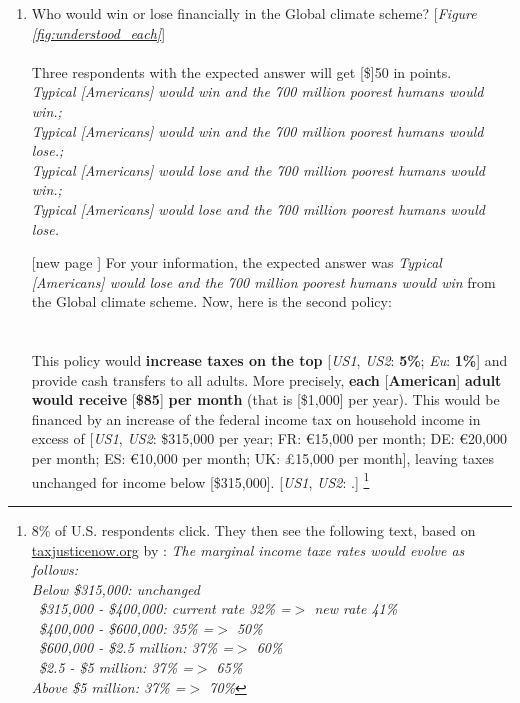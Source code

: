 \documentclass[12pt,english]{article}
\begin{document}
\begin{enumerate}[resume]
\item \label{q:understood_gcs} Who would win or lose financially in the Global climate scheme? [\textit{Figure \ref{fig:understood_each}}] \\
\\
Three respondents with the expected answer will get [\$]50 in points.
\\ \textit{Typical [Americans] would win and the 700 million poorest humans would win.; \\Typical [Americans] would win and the 700 million poorest humans would lose.; \\Typical [Americans] would lose and the 700 million poorest humans would win.; \\Typical [Americans] would lose and the 700 million poorest humans would lose.}
\item[[new page\!\!\!]] For your information, the expected answer was \textit{Typical [Americans] would lose and the 700 million poorest humans would win} from the Global climate scheme. Now, here is the second policy: \\ 
\\
\textbf{}\\ This policy would \textbf{increase taxes on the top} [\textit{US1}, \textit{US2}: \textbf{5\%}; 
\textit{Eu}: \textbf{1\%}] and provide cash transfers to all adults. More precisely, \textbf{each }[\textbf{American}]\textbf{ adult would receive }[\textbf{\$85}]\textbf{ per month} (that is [\$1,000] per year). 
This would be financed by an increase of the federal income tax on household income in excess of [\textit{US1}, \textit{US2}: \$315,000 per year; FR: \euro{}15,000 per month; DE: \euro{}20,000 per month; ES: \euro{}10,000 per month; UK: £15,000 per month], leaving taxes unchanged for income below [\$315,000]. [\textit{US1}, \textit{US2}: .]
\footnote{8\% of U.S. respondents click. They then see the following text, based on \href{https://taxjusticenow.org/\#makeYourOwnTaxPlan}{taxjusticenow.org} by \citet{saez_triumph_2019}: \textit{The marginal income taxe rates would evolve as follows:\\Below \$315,000: unchanged \\ ~\$315,000 - \$400,000: current rate 32\% =$>$ new rate 41\% \\ ~\$400,000 - \$600,000: 35\% =$>$ 50\% \\ ~\$600,000 - \$2.5 million: 37\% =$>$ 60\% \\ ~\$2.5 - \$5 million: 37\% =$>$ 65\% \\ Above \$5 million: 37\% =$>$ 70\%}}

\end{enumerate}
\end{document}
